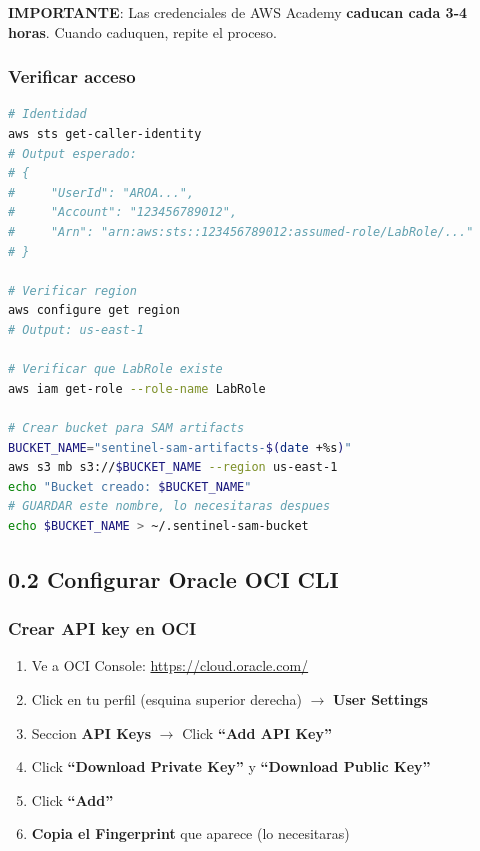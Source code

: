 \documentclass[11pt,a4paper]{article}
\begin{document}
\textbf{IMPORTANTE}: Las credenciales de AWS Academy \textbf{caducan cada 3-4 horas}. Cuando caduquen, repite el proceso.

\subsubsection{Verificar acceso}

\begin{lstlisting}[language=Bash, caption={Verificar que las credenciales funcionan}]
# Identidad
aws sts get-caller-identity
# Output esperado:
# {
#     "UserId": "AROA...",
#     "Account": "123456789012",
#     "Arn": "arn:aws:sts::123456789012:assumed-role/LabRole/..."
# }

# Verificar region
aws configure get region
# Output: us-east-1

# Verificar que LabRole existe
aws iam get-role --role-name LabRole

# Crear bucket para SAM artifacts
BUCKET_NAME="sentinel-sam-artifacts-$(date +%s)"
aws s3 mb s3://$BUCKET_NAME --region us-east-1
echo "Bucket creado: $BUCKET_NAME"
# GUARDAR este nombre, lo necesitaras despues
echo $BUCKET_NAME > ~/.sentinel-sam-bucket
\end{lstlisting}

\subsection{0.2 Configurar Oracle OCI CLI}

\subsubsection{Crear API key en OCI}

\begin{enumerate}[leftmargin=*]
    \item Ve a OCI Console: \url{https://cloud.oracle.com/}
    \item Click en tu perfil (esquina superior derecha) $\rightarrow$ \textbf{User Settings}
    \item Seccion \textbf{API Keys} $\rightarrow$ Click \textbf{``Add API Key''}
    \item Click \textbf{``Download Private Key''} y \textbf{``Download Public Key''}
    \item Click \textbf{``Add''}
    \item \textbf{Copia el Fingerprint} que aparece (lo necesitaras)
\end{enumerate}
\end{document}
